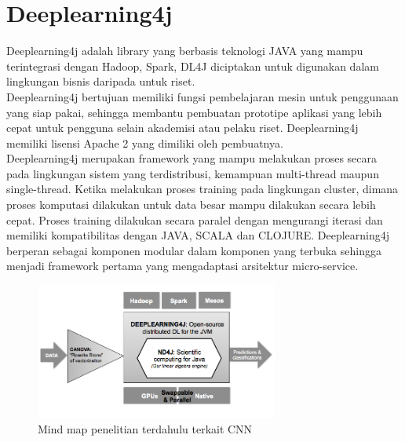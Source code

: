 \section{Deeplearning4j}
Deeplearning4j adalah library yang berbasis teknologi JAVA yang mampu terintegrasi dengan Hadoop, Spark, DL4J diciptakan untuk digunakan dalam lingkungan bisnis daripada untuk riset.\\
Deeplearning4j bertujuan memiliki fungsi pembelajaran mesin untuk penggunaan yang siap pakai, sehingga membantu pembuatan prototipe aplikasi yang lebih cepat untuk pengguna selain akademisi atau pelaku riset. Deeplearning4j memiliki lisensi Apache 2 yang dimiliki oleh pembuatnya.\\
Deeplearning4j merupakan framework yang mampu melakukan proses secara pada lingkungan sistem yang terdistribusi, kemampuan multi-thread maupun single-thread. Ketika melakukan proses training pada lingkungan cluster, dimana proses komputasi dilakukan untuk data besar mampu dilakukan secara lebih cepat. Proses training dilakukan secara paralel dengan mengurangi iterasi dan memiliki kompatibilitas dengan JAVA, SCALA dan CLOJURE. Deeplearning4j berperan sebagai komponen modular dalam komponen yang terbuka sehingga menjadi framework pertama yang mengadaptasi arsitektur micro-service.
\begin{figure}[htp]
	\centering
	\includegraphics[width=8cm]{pics/dl4j}
	\caption{Mind map penelitian terdahulu terkait CNN}
	\label{fig:dl4j}
\end{figure}\\

